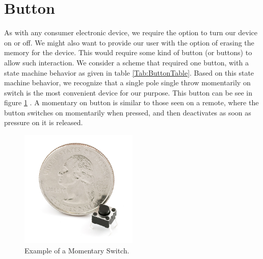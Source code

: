 \section{Button}
\label{Sec:Button}
As with any consumer electronic device, we require the option to turn our device on or off. We might also want to provide our user with the option of erasing the memory for the device. This would require some kind of button (or buttons) to allow such interaction. We consider a scheme that required one button, with a state machine behavior as given in table \ref{Tab:ButtonTable}. Based on this state machine behavior, we recognize that a single pole single throw momentarily on switch is the most convenient device for our purpose. This button can be see in figure \ref{Fig:MomButton} \cite{Web:SFEMOM}.
A momentary on button is similar to those seen on a remote, where the button switches on momentarily when pressed, and then deactivates as soon as pressure on it is released.
\begin{figure}
\begin{center}
\includegraphics[width=0.5\textwidth]{images/MOMButton.jpg}
\caption{Example of a Momentary Switch.}
\label{Fig:MomButton}
\end{center}
\end{figure}


